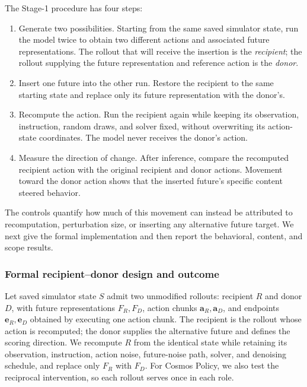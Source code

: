 \documentclass{article}
\begin{document}
The Stage-1 procedure has four steps:
\begin{enumerate}
  \item Generate two possibilities. Starting from the same saved simulator state, run the model twice to obtain two different actions and associated future representations. The rollout that will receive the insertion is the \emph{recipient}; the rollout supplying the future representation and reference action is the \emph{donor}.
  \item Insert one future into the other run. Restore the recipient to the same starting state and replace only its future representation with the donor's.
  \item Recompute the action. Run the recipient again while keeping its observation, instruction, random draws, and solver fixed, without overwriting its action-state coordinates. The model never receives the donor's action.
  \item Measure the direction of change. After inference, compare the recomputed recipient action with the original recipient and donor actions. Movement toward the donor action shows that the inserted future's specific content steered behavior.
\end{enumerate}

The controls quantify how much of this movement can instead be attributed to recomputation, perturbation size, or inserting any alternative future target. We next give the formal implementation and then report the behavioral, content, and scope results.

\subsubsection{Formal recipient--donor design and outcome}

Let saved simulator state $S$ admit two unmodified rollouts: recipient $R$ and donor $D$, with future representations $F_R,F_D$, action chunks $\mathbf a_R,\mathbf a_D$, and endpoints $\mathbf e_R,\mathbf e_D$ obtained by executing one action chunk. The recipient is the rollout whose action is recomputed; the donor supplies the alternative future and defines the scoring direction. We recompute $R$ from the identical state while retaining its observation, instruction, action noise, future-noise path, solver, and denoising schedule, and replace only $F_R$ with $F_D$. For Cosmos Policy, we also test the reciprocal intervention, so each rollout serves once in each role.
\end{document}
